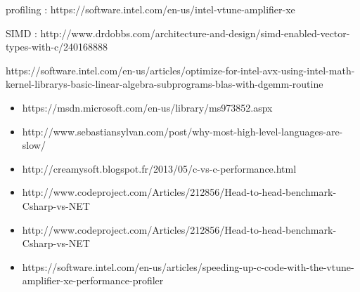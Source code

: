 \newpage



profiling :
https://software.intel.com/en-us/intel-vtune-amplifier-xe


SIMD :
http://www.drdobbs.com/architecture-and-design/simd-enabled-vector-types-with-c/240168888

https://software.intel.com/en-us/articles/optimize-for-intel-avx-using-intel-math-kernel-librarys-basic-linear-algebra-subprograms-blas-with-dgemm-routine

\begin{itemize}
\item https://msdn.microsoft.com/en-us/library/ms973852.aspx
\item http://www.sebastiansylvan.com/post/why-most-high-level-languages-are-slow/
\item http://creamysoft.blogspot.fr/2013/05/c-vs-c-performance.html
\item http://www.codeproject.com/Articles/212856/Head-to-head-benchmark-Csharp-vs-NET
\item http://www.codeproject.com/Articles/212856/Head-to-head-benchmark-Csharp-vs-NET
\item https://software.intel.com/en-us/articles/speeding-up-c-code-with-the-vtune-amplifier-xe-performance-profiler
\end{itemize}







